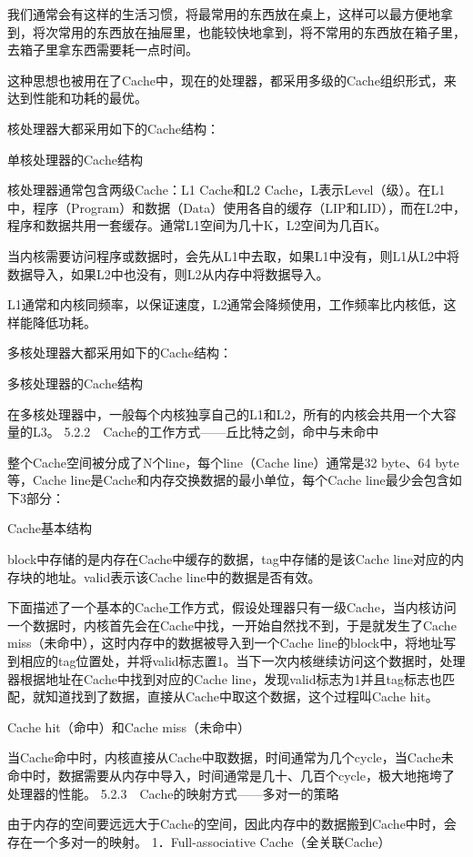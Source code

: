 \documentclass[12pt,UTF8]{ctexbook}
\begin{document}
我们通常会有这样的生活习惯，将最常用的东西放在桌上，这样可以最方便地拿到，将次常用的东西放在抽屉里，也能较快地拿到，将不常用的东西放在箱子里，去箱子里拿东西需要耗一点时间。

这种思想也被用在了Cache中，现在的处理器，都采用多级的Cache组织形式，来达到性能和功耗的最优。

核处理器大都采用如下的Cache结构：

单核处理器的Cache结构

核处理器通常包含两级Cache：L1 Cache和L2 Cache，L表示Level（级）。在L1中，程序（Program）和数据（Data）使用各自的缓存（LIP和LID），而在L2中，程序和数据共用一套缓存。通常L1空间为几十K，L2空间为几百K。

当内核需要访问程序或数据时，会先从L1中去取，如果L1中没有，则L1从L2中将数据导入，如果L2中也没有，则L2从内存中将数据导入。

L1通常和内核同频率，以保证速度，L2通常会降频使用，工作频率比内核低，这样能降低功耗。

多核处理器大都采用如下的Cache结构：

多核处理器的Cache结构

在多核处理器中，一般每个内核独享自己的L1和L2，所有的内核会共用一个大容量的L3。
5.2.2　Cache的工作方式——丘比特之剑，命中与未命中

整个Cache空间被分成了N个line，每个line（Cache line）通常是32 byte、64 byte等，Cache line是Cache和内存交换数据的最小单位，每个Cache line最少会包含如下3部分：

Cache基本结构

block中存储的是内存在Cache中缓存的数据，tag中存储的是该Cache line对应的内存块的地址。valid表示该Cache line中的数据是否有效。

下面描述了一个基本的Cache工作方式，假设处理器只有一级Cache，当内核访问一个数据时，内核首先会在Cache中找，一开始自然找不到，于是就发生了Cache miss（未命中），这时内存中的数据被导入到一个Cache line的block中，将地址写到相应的tag位置处，并将valid标志置1。当下一次内核继续访问这个数据时，处理器根据地址在Cache中找到对应的Cache line，发现valid标志为1并且tag标志也匹配，就知道找到了数据，直接从Cache中取这个数据，这个过程叫Cache hit。

Cache hit（命中）和Cache miss（未命中）

当Cache命中时，内核直接从Cache中取数据，时间通常为几个cycle，当Cache未命中时，数据需要从内存中导入，时间通常是几十、几百个cycle，极大地拖垮了处理器的性能。
5.2.3　Cache的映射方式——多对一的策略

由于内存的空间要远远大于Cache的空间，因此内存中的数据搬到Cache中时，会存在一个多对一的映射。
1．Full-associative Cache（全关联Cache）
\end{document}
